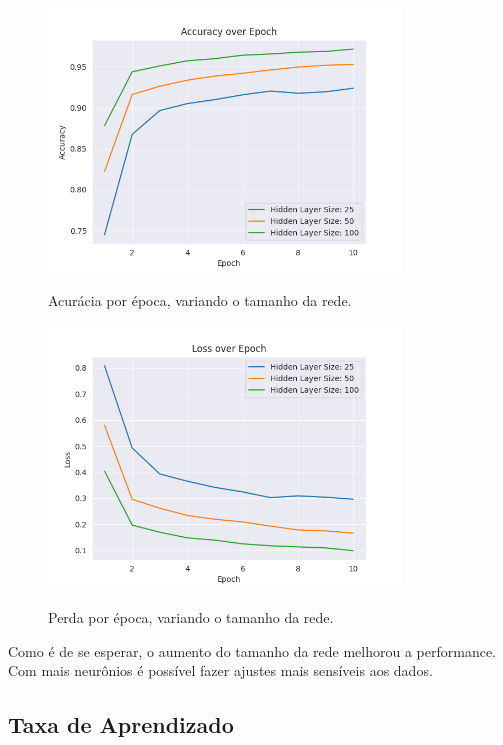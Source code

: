 \documentclass[a4paper]{article}
\begin{document}
\begin{figure}[H]
  \begin{center}
  {\includegraphics[height=7cm]{./images/Accuracy_over_Epoch_var_Hidden.png}}
  \end{center}
  \caption{Acurácia por época, variando o tamanho da rede. \label{fig:aeh}}
\end{figure}

\begin{figure}[H]
  \begin{center}
  {\includegraphics[height=7cm]{./images/Loss_over_Epoch_var_Hidden.png}}
  \end{center}
  \caption{Perda por época, variando o tamanho da rede. \label{fig:leh}}
\end{figure}

Como é de se esperar, o aumento do tamanho da rede melhorou a performance. Com mais neurônios é possível fazer ajustes mais sensíveis aos dados.

\subsection{Taxa de Aprendizado}%
\label{sub:Taxa de Aprendizado}
\end{document}

